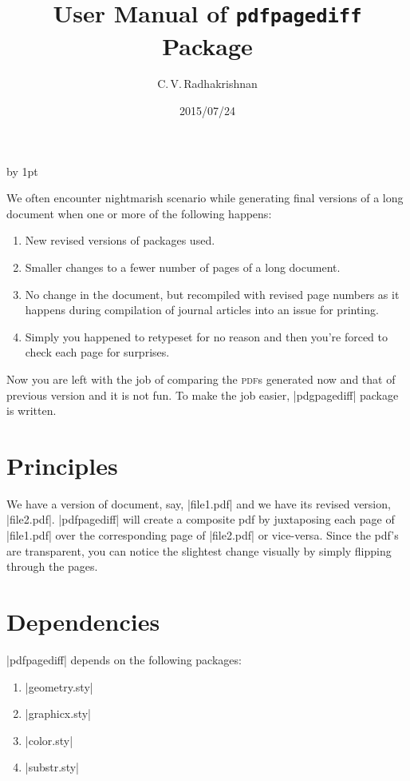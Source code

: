 \documentclass[a4paper]{article}
\begin{document}
\title{User Manual of \texttt{pdfpagediff} Package}
\date{2015/07/24}
\author{C.\,V.\,Radhakrishnan}

\maketitle
\advance\baselineskip by 1pt

\noindent We often encounter nightmarish scenario while generating
final versions of a long document when one or more of the following
happens:
\begin{enumerate} 
\item New revised versions of packages used. 
\item Smaller changes to a fewer number of pages of a long document.
\item No change in the document, but recompiled with revised page
  numbers as it happens during compilation of journal articles into an
  issue for printing. 
\item Simply you happened to retypeset for no reason and then you're
  forced to check each page for surprises.
\end{enumerate}

Now you are left with the job of comparing the \textsc{pdf}s generated
now and that of previous version and it is not fun. To make the job
easier, |pdgpagediff| package is written.

\section{Principles}

We have a version of document, say, |file1.pdf| and we have its
revised version, |file2.pdf|.  |pdfpagediff| will create a composite
pdf by juxtaposing each page of |file1.pdf| over the corresponding
page of |file2.pdf| or vice-versa. Since the pdf's are transparent,
you can notice the slightest change visually by simply flipping
through the pages.

\section{Dependencies}

|pdfpagediff| depends on the following packages:
\begin{enumerate}
\item |geometry.sty|
\item |graphicx.sty|
\item |color.sty|
\item |substr.sty|
\end{enumerate}
\end{document}
